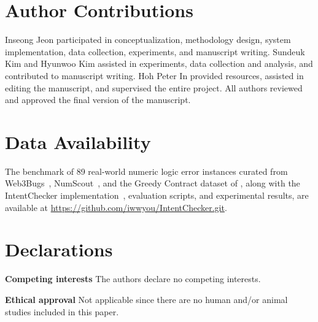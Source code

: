 \documentclass[pdflatex,sn-basic]{sn-jnl}%
\theoremstyle{thmstyleone}%
\theoremstyle{thmstyletwo}%
\theoremstyle{thmstylethree}%
\begin{document}
\section*{Author Contributions}
Inseong Jeon participated in conceptualization, methodology design, system implementation, data collection, experiments, and manuscript writing. Sundeuk Kim and Hyunwoo Kim assisted in experiments, data collection and analysis, and contributed to manuscript writing. Hoh Peter In provided resources, assisted in editing the manuscript, and supervised the entire project. All authors reviewed and approved the final version of the manuscript.

\section*{Data Availability}
The benchmark of 89 real-world numeric logic error instances curated from Web3Bugs~\citep{exploitablebugs}, NumScout~\citep{numscout}, and the Greedy Contract dataset of \citet{flyinointment}, along with the IntentChecker implementation~\citep{intentchecker}, evaluation scripts, and experimental results, are available at \url{https://github.com/iwwyou/IntentChecker.git}.

\section*{Declarations}

\noindent\textbf{Competing interests} The authors declare no competing interests.

\noindent\textbf{Ethical approval} Not applicable since there are no human and/or animal studies included in this paper.
\end{document}
